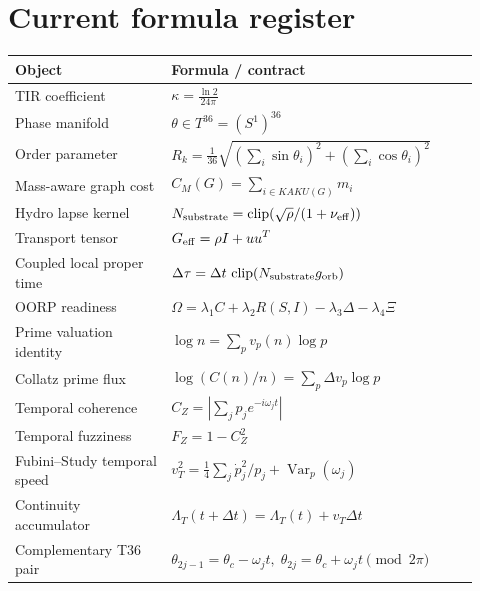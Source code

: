 \chapter{Current formula register}
\begin{longtable}{p{0.31\linewidth}p{0.61\linewidth}}
\toprule
Object & Formula / contract\\\midrule
TIR coefficient & \(\displaystyle \kappa=\frac{\ln2}{24\pi}\)\\
Phase manifold & \(\theta\in T^{36}=(S^1)^{36}\)\\
Order parameter & \(\displaystyle R_k=\frac1{36}\sqrt{(\sum_i\sin\theta_i)^2+(\sum_i\cos\theta_i)^2}\)\\
Mass-aware graph cost & \(\displaystyle C_M(G)=\sum_{i\in KAKU(G)}m_i\)\\
Hydro lapse kernel & \(\displaystyle N_{\rm substrate}=\operatorname{clip}(\sqrt\rho/(1+\nu_{\rm eff}))\)\\
Transport tensor & \(\displaystyle G_{\rm eff}=\rho I+uu^T\)\\
Coupled local proper time & \(\displaystyle \Delta\tau=\Delta t\,\operatorname{clip}(N_{\rm substrate}g_{\rm orb})\)\\
OORP readiness & \(\displaystyle \Omega=\lambda_1C+\lambda_2R(S,I)-\lambda_3\Delta-\lambda_4\Xi\)\\
Prime valuation identity & \(\displaystyle \log n=\sum_pv_p(n)\log p\)\\
Collatz prime flux & \(\displaystyle \log(C(n)/n)=\sum_p\Delta v_p\log p\)\\
Temporal coherence & \(\displaystyle C_Z=|\sum_jp_je^{-i\omega_jt}|\)\\
Temporal fuzziness & \(\displaystyle F_Z=1-C_Z^2\)\\
Fubini--Study temporal speed & \(\displaystyle v_T^2=\frac14\sum_j\dot p_j^2/p_j+\operatorname{Var}_p(\omega_j)\)\\
Continuity accumulator & \(\displaystyle \Lambda_T(t+\Delta t)=\Lambda_T(t)+v_T\Delta t\)\\
Complementary T36 pair & \(\theta_{2j-1}=\theta_c-\omega_jt,\;\theta_{2j}=\theta_c+\omega_jt\pmod{2\pi}\)\\
\bottomrule
\end{longtable}

